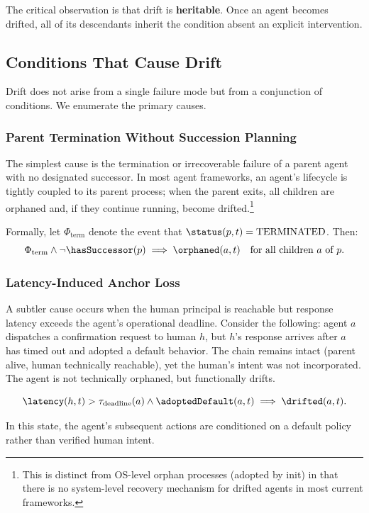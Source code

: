 The critical observation is that drift is \textbf{heritable}. Once an agent becomes drifted, all of its descendants inherit the condition absent an explicit intervention.

\subsection{Conditions That Cause Drift}

Drift does not arise from a single failure mode but from a conjunction of conditions. We enumerate the primary causes.

\subsubsection{Parent Termination Without Succession Planning}

The simplest cause is the termination or irrecoverable failure of a parent agent with no designated successor. In most agent frameworks, an agent's lifecycle is tightly coupled to its parent process; when the parent exits, all children are orphaned and, if they continue running, become drifted.\footnote{This is distinct from OS-level orphan processes (adopted by init) in that there is no system-level recovery mechanism for drifted agents in most current frameworks.}

Formally, let $\Phi_{\text{term}}$ denote the event that $\status(p, t) = \text{TERMINATED}$. Then:
\[
\Phi_{\text{term}} \land \neg \hasSuccessor(p) \implies \orphaned(a, t) \quad \text{for all children } a \text{ of } p.
\]

\subsubsection{Latency-Induced Anchor Loss}

A subtler cause occurs when the human principal is reachable but response latency exceeds the agent's operational deadline. Consider the following: agent $a$ dispatches a confirmation request to human $h$, but $h$'s response arrives after $a$ has timed out and adopted a default behavior. The chain remains intact (parent alive, human technically reachable), yet the human's intent was not incorporated. The agent is not technically orphaned, but functionally drifts.

\[
\latency(h, t) > \tau_{\text{deadline}}(a) \land \adoptedDefault(a, t) \implies \drifted(a, t).
\]

In this state, the agent's subsequent actions are conditioned on a default policy rather than verified human intent.

